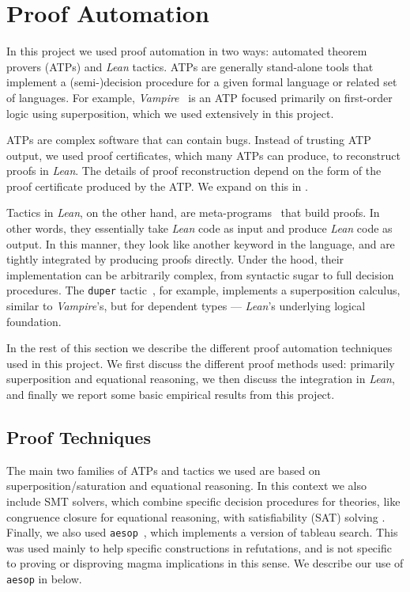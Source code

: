 \section{Proof Automation}\label{automated-sec}

In this project we used proof automation in two ways: automated theorem provers (ATPs) and \emph{Lean} tactics.
ATPs are generally stand-alone tools that implement a (semi-)decision procedure for a given formal language or related set of languages.
For example, \emph{Vampire}~\cite{DBLP:conf/cav/KovacsV13} is an ATP focused primarily on first-order logic using superposition, which we used extensively in this project.

ATPs are complex software that can contain bugs.
Instead of trusting ATP output, we used proof certificates, which many ATPs can produce, to reconstruct proofs in \emph{Lean}.
The details of proof reconstruction depend on the form of the proof certificate produced by the ATP.
We expand on this in .

Tactics in \emph{Lean}, on the other hand, are meta-programs~\cite{DBLP:journals/pacmpl/EbnerURAM17} that build proofs.
In other words, they essentially take \emph{Lean} code as input and produce \emph{Lean} code as output.
In this manner, they look like another keyword in the language, and are tightly integrated by producing proofs directly.
Under the hood, their implementation can be arbitrarily complex, from syntactic sugar to full decision procedures.
The \texttt{duper} tactic~\cite{DBLP:conf/itp/CluneQBA24}, for example, implements a superposition calculus, similar to \emph{Vampire}'s, but for dependent types --- \emph{Lean}'s underlying logical foundation.

In the rest of this section we describe the different proof automation techniques used in this project.
We first discuss the different proof methods used: primarily superposition and equational reasoning, we then discuss the integration in \emph{Lean}, and finally we report some basic empirical results from this project.

\subsection{Proof Techniques}

The main two families of ATPs and tactics we used are based on superposition/saturation and equational reasoning.
In this context we also include SMT solvers, which combine specific decision procedures for theories, like congruence closure for equational reasoning, with satisfiability (SAT) solving \cite{deMoura-Bjorner-2009}.
Finally, we also used \texttt{aesop}~\cite{DBLP:conf/cpp/LimpergF23}, which implements a version of tableau search.
This was used mainly to help specific constructions in refutations, and is not specific to proving or disproving magma implications in this sense.
We describe our use of \texttt{aesop} in  below.

